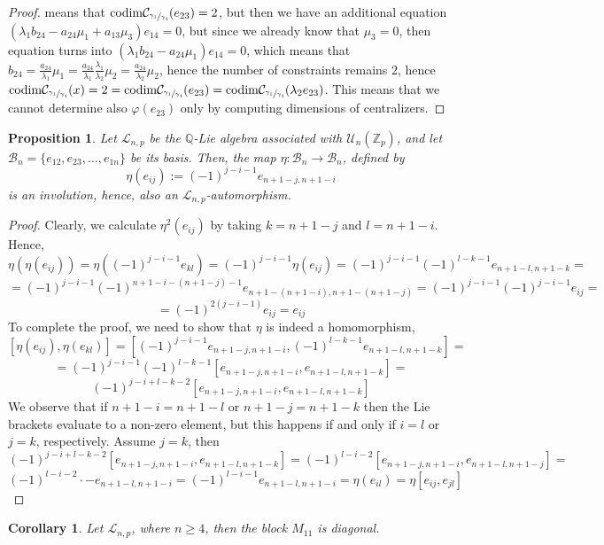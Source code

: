 \documentclass[12pt]{article}
\newcommand*\circled[1]{\tikz[baseline=(char.base)]{
            \small \node[shape=circle,draw,inner sep=1pt] (char) {#1};}}
\newtheorem{proposition}[theorem]{Proposition}
\newtheorem{corollary}[theorem]{Corollary}
\begin{document}
\begin{proof}
means that $\mathrm{codim}\mathcal{C}_{\sfrac{\gamma_1}{\gamma_4}}(e_{23})=2$, but then we have an additional equation \circled{4} $(\lambda_1 b_{24}-a_{24}\mu_1+a_{13}\mu_3)e_{14}=0$, but since we already know that $\mu_3=0$, then equation \circled{4} turns into $(\lambda_1 b_{24}-a_{24}\mu_1)e_{14}=0$, which means that $b_{24}=\frac{a_{24}}{\lambda_1}\mu_1=\frac{a_{24}}{\lambda_1}\frac{\lambda_1}{\lambda_2}\mu_2=\frac{a_{24}}{\lambda_2}\mu_2$, hence the number of constraints remains $2$, hence $\mathrm{codim}\mathcal{C}_{\sfrac{\gamma_1}{\gamma_4}}(x)=2=\mathrm{codim}\mathcal{C}_{\sfrac{\gamma_1}{\gamma_4}}(e_{23})=\mathrm{codim}\mathcal{C}_{\sfrac{\gamma_1}{\gamma_4}}(\lambda_2 e_{23})$. This means that we cannot determine also $\varphi(e_{23})$ only by computing dimensions of centralizers.
\end{proof}
\begin{proposition}
\label{prop.involution}
Let $\mathcal{L}_{n,p}$ be the $\mathbb{Q}$-Lie algebra associated with $\mathcal{U}_n(\mathbb{Z}_p)$, and let $\mathcal{B}_n=\{e_{12},e_{23},\dots,e_{1n}\}$ be its basis. Then, the map $\eta:\mathcal{B}_n\rightarrow \mathcal{B}_n$, defined by \[\eta(e_{ij}):=(-1)^{j-i-1}e_{n+1-j,n+1-i}\] is an involution, hence, also an $\mathcal{L}_{n,p}$-automorphism.
\end{proposition}
\begin{proof}
Clearly, we calculate $\eta^2(e_{ij})$ by taking $k=n+1-j$ and $l=n+1-i$. Hence, \[\eta(\eta(e_{ij}))=\eta((-1)^{j-i-1}e_{kl})=(-1)^{j-i-1}\eta(e_{ij})=(-1)^{j-i-1}(-1)^{l-k-1}e_{n+1-l,n+1-k}=\]\[=(-1)^{j-i-1}(-1)^{n+1-i-(n+1-j)-1}e_{n+1-(n+1-i),n+1-(n+1-j)}=(-1)^{j-i-1}(-1)^{j-i-1}e_{ij}=\]\[=(-1)^{2(j-i-1)}e_{ij}=e_{ij}\]
To complete the proof, we need to show that $\eta$ is indeed a homomorphism,
\[[\eta(e_{ij}),\eta(e_{kl})]=[(-1)^{j-i-1}e_{n+1-j,n+1-i},(-1)^{l-k-1}e_{n+1-l,n+1-k}]=\]\[=(-1)^{j-i-1}(-1)^{l-k-1}[e_{n+1-j,n+1-i},e_{n+1-l,n+1-k}]=\]\[(-1)^{j-i+l-k-2}[e_{n+1-j,n+1-i},e_{n+1-l,n+1-k}]\]
We observe that if $n+1-i=n+1-l$ or $n+1-j=n+1-k$ then the Lie brackets evaluate to a non-zero element, but this happens if and only if $i=l$ or $j=k$, respectively. Assume $j=k$, then \[(-1)^{j-i+l-k-2}[e_{n+1-j,n+1-i},e_{n+1-l,n+1-k}]=(-1)^{l-i-2}[e_{n+1-j,n+1-i},e_{n+1-l,n+1-j}]=\]\[(-1)^{l-i-2}\cdot-e_{n+1-l,n+1-i}=(-1)^{l-i-1}e_{n+1-l,n+1-i}=\eta(e_{il})=\eta[e_{ij},e_{jl}]\] 
\end{proof}
\begin{corollary}
\label{m11.diagonal}
Let $\mathcal{L}_{n,p}$, where $n\geq 4$, then the block $M_{11}$ is diagonal.
\end{corollary}
\end{document}

